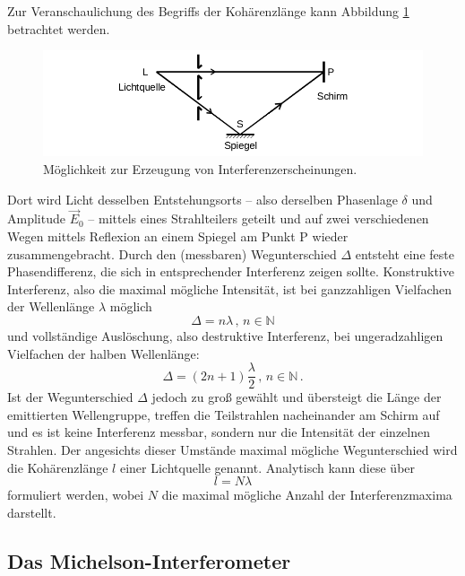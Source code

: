 Zur Veranschaulichung des Begriffs der Kohärenzlänge kann Abbildung \ref{fig:Prinzip} betrachtet werden. 
\begin{figure}
    \centering
    \includegraphics[width=\textwidth]{plots/Interferenz_Prinzip.png}
    \caption{Möglichkeit zur Erzeugung von Interferenzerscheinungen.}
    \label{fig:Prinzip}
\end{figure}
Dort wird Licht desselben Entstehungsorts -- also derselben Phasenlage $\delta$ und Amplitude $\vec{E}_0$ -- mittels eines 
Strahlteilers geteilt und auf zwei verschiedenen Wegen mittels Reflexion an einem Spiegel am Punkt P wieder zusammengebracht. 
Durch den (messbaren) Wegunterschied $\Delta$ entsteht eine feste Phasendifferenz, die sich in entsprechender Interferenz zeigen sollte. 
Konstruktive Interferenz, also die maximal mögliche Intensität, ist bei ganzzahligen Vielfachen der Wellenlänge $\lambda$ möglich 
\begin{equation*}
    \Delta = n\lambda \,, \, n \in \mathbb{N}
\end{equation*}
und vollständige Auslöschung, also destruktive Interferenz, bei ungeradzahligen Vielfachen der halben Wellenlänge:
\begin{equation*}
    \Delta = (2n+1)\frac{\lambda}{2}\,,\,n\in\mathbb{N}\,.
\end{equation*}
Ist der Wegunterschied $\Delta$ jedoch zu groß gewählt und übersteigt die Länge der emittierten Wellengruppe, treffen 
die Teilstrahlen nacheinander am Schirm auf und es ist keine Interferenz messbar, sondern nur die Intensität der einzelnen 
Strahlen. 
Der angesichts dieser Umstände maximal mögliche Wegunterschied wird die Kohärenzlänge $l$ einer Lichtquelle genannt. 
Analytisch kann diese über 
\begin{equation*}
    l=N\lambda
\end{equation*}
formuliert werden, wobei $N$ die maximal mögliche Anzahl der Interferenzmaxima darstellt. 

\subsection{Das Michelson-Interferometer}

